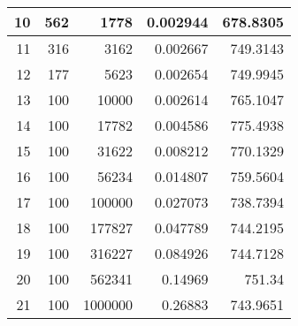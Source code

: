 \begin{table}[htbp]
\begin{tabular}{|r|r|r|r|r|}
		\midrule
		10                                & 562                             & 1778                            & 0.002944                           & 678.8305                             \\
		\midrule
		11                                & 316                             & 3162                            & 0.002667                           & 749.3143                             \\
		\midrule
		12                                & 177                             & 5623                            & 0.002654                           & 749.9945                             \\
		\midrule
		13                                & 100                             & 10000                           & 0.002614                           & 765.1047                             \\
		\midrule
		14                                & 100                             & 17782                           & 0.004586                           & 775.4938                             \\
		\midrule
		15                                & 100                             & 31622                           & 0.008212                           & 770.1329                             \\
		\midrule
		16                                & 100                             & 56234                           & 0.014807                           & 759.5604                             \\
		\midrule
		17                                & 100                             & 100000                          & 0.027073                           & 738.7394                             \\
		\midrule
		18                                & 100                             & 177827                          & 0.047789                           & 744.2195                             \\
		\midrule
		19                                & 100                             & 316227                          & 0.084926                           & 744.7128                             \\
		\midrule
		20                                & 100                             & 562341                          & 0.14969                            & 751.34                               \\
		\midrule
		21                                & 100                             & 1000000                         & 0.26883                            & 743.9651                             \\

\end{tabular}
\end{table}
